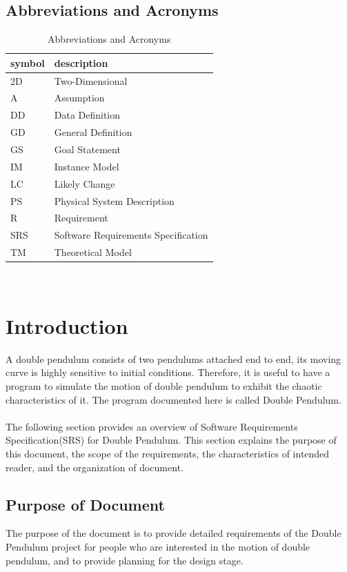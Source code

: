 \documentclass[12pt]{article}
\begin{document}
\subsection{Abbreviations and Acronyms}\label{sec_abbandacr}
\renewcommand{\arraystretch}{1.2}
\begin{table}[H]
  \centering
  \begin{tabular}{l l} 
    \toprule    
    \textbf{symbol} & \textbf{description}\\
    \midrule 
    2D & Two-Dimensional\\
    A & Assumption\\
    DD & Data Definition\\
    GD & General Definition\\
    GS & Goal Statement\\
    IM & Instance Model\\
    LC & Likely Change\\
    PS & Physical System Description\\
    R & Requirement\\
    SRS & Software Requirements Specification\\
    TM & Theoretical Model\\
    \bottomrule
  \end{tabular}\\
  \caption{Abbreviations and Acronyms}
\end{table}

\newpage
\section{Introduction}\label{sec_intro}
A double pendulum consists of two pendulums attached end to end, its moving curve is highly sensitive to initial conditions. Therefore, it is useful to have a program to simulate the motion of double pendulum to exhibit the chaotic characteristics of it. The program documented here is called Double Pendulum.\\\\The following section provides an overview of Software Requirements Specification(SRS) for Double Pendulum. This section explains the purpose of this document, the scope of the requirements, the characteristics of intended reader, and the organization of document. 

\subsection{Purpose of Document}\label{sec_purpose}
The purpose of the document is to provide detailed requirements of the Double Pendulum project for people who are interested in the motion of double pendulum, and to provide planning for the design stage. 
\end{document}
